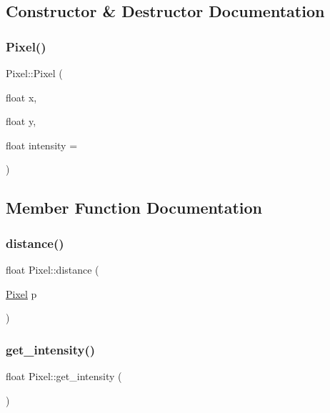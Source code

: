 \subsection{Constructor \& Destructor Documentation}
\mbox{\label{class_pixel_a2b002814b07e6d2679dfe3dbbe6b6bb2}} 
\subsubsection{\texorpdfstring{Pixel()}{Pixel()}}
{\footnotesize\ttfamily Pixel\+::\+Pixel (\begin{DoxyParamCaption}\item[{float}]{x,  }\item[{float}]{y,  }\item[{float}]{intensity = {} }\end{DoxyParamCaption})}



\subsection{Member Function Documentation}
\mbox{\label{class_pixel_afa4a51cc8da3bbc494978266b17facdb}} 
\subsubsection{\texorpdfstring{distance()}{distance()}}
{\footnotesize\ttfamily float Pixel\+::distance (\begin{DoxyParamCaption}\item[{\hyperlink{class_pixel}{Pixel}}]{p }\end{DoxyParamCaption})}

\mbox{\label{class_pixel_aa7897039a0142fd49e3c71402f708031}} 
\subsubsection{\texorpdfstring{get\+\_\+intensity()}{get\_intensity()}}
{\footnotesize\ttfamily float Pixel\+::get\+\_\+intensity (\begin{DoxyParamCaption}{ }\end{DoxyParamCaption})}

